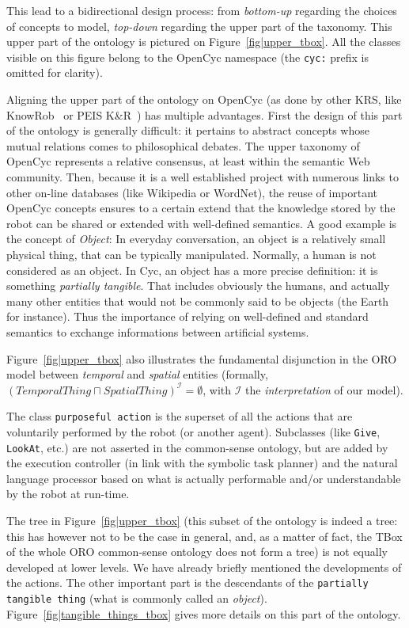 \documentclass[preprint,3p,times]{elsarticle}
\newcommand{\concept}[1]{{\small \texttt{#1}}}
\begin{document}
This lead to a bidirectional design process: from \emph{bottom-up} regarding
the choices of concepts to model, \emph{top-down} regarding the upper part of the
taxonomy. This upper part of the ontology is pictured on
Figure~\ref{fig|upper_tbox}. All the classes visible on this figure belong to the
{\sc OpenCyc} namespace (the {\tt cyc:} prefix is omitted for clarity).

Aligning the upper part of the ontology on {\sc OpenCyc} (as done by other
KRS, like {\sc KnowRob}~\cite{Tenorth2009a} or PEIS K\&R~\cite{Daoutis2009})
has multiple advantages. First the design of this part of the ontology is
generally difficult: it pertains to abstract concepts whose mutual relations
comes to philosophical debates. The upper taxonomy of {\sc OpenCyc} represents
a relative consensus, at least within the semantic Web community. Then, because
it is a well established project with numerous links to other on-line databases
(like Wikipedia or WordNet), the reuse of important {\sc OpenCyc} concepts
ensures to a certain extend that the knowledge stored by the robot can be
shared or extended with well-defined semantics. A good example is the concept
of \emph{Object}: In everyday conversation, an object is a relatively small
physical thing, that can be typically manipulated. Normally, a human is not
considered as an object. In {\sc Cyc}, an object has a more precise definition:
it is something \emph{partially tangible}. That includes obviously the humans,
and actually many other entities that would not be commonly said to be objects
(the Earth for instance). Thus the importance of relying on well-defined and
standard semantics to exchange informations between artificial systems.

Figure~\ref{fig|upper_tbox} also illustrates the fundamental disjunction
in the ORO model between \emph{temporal} and \emph{spatial} entities (formally,
$(TemporalThing \sqcap SpatialThing)^{\mathcal{I}} = \emptyset$, with
$\mathcal{I}$ the \emph{interpretation} of our model).

The class \concept{purposeful action} is the superset of all the actions that
are voluntarily performed by the robot (or another agent). Subclasses (like
\concept{Give}, \concept{LookAt}, etc.) are not asserted in the common-sense
ontology, but are added by the execution controller (in link with the symbolic
task planner) and the natural language processor based on what is actually
performable and/or understandable by the robot at run-time.

The tree in Figure~\ref{fig|upper_tbox} (this subset of the ontology is indeed
a tree: this has however not to be the case in general, and, as a matter of
fact, the TBox of the whole ORO common-sense ontology does not form a tree) is
not equally developed at lower levels. We have already briefly mentioned the
developments of the actions. The other important part is the descendants of the
\concept{partially tangible thing} (what is commonly called an \emph{object}).
Figure~\ref{fig|tangible_things_tbox} gives more details on this part of the
ontology.
\end{document}
